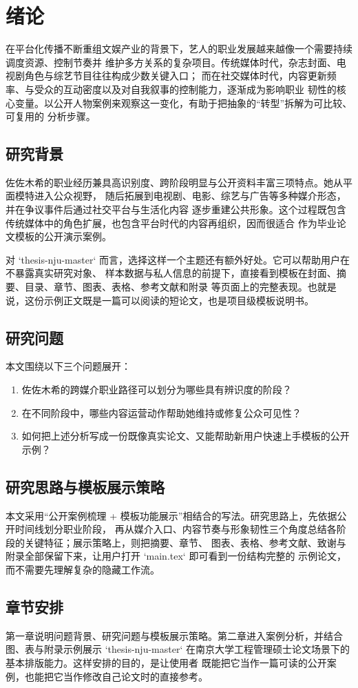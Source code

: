 \chapter{绪论}

在平台化传播不断重组文娱产业的背景下，艺人的职业发展越来越像一个需要持续调度资源、控制节奏并
维护多方关系的复杂项目。传统媒体时代，杂志封面、电视剧角色与综艺节目往往构成少数关键入口；
而在社交媒体时代，内容更新频率、与受众的互动密度以及对自我叙事的控制能力，逐渐成为影响职业
韧性的核心变量。以公开人物案例来观察这一变化，有助于把抽象的“转型”拆解为可比较、可复用的
分析步骤。

\section{研究背景}

佐佐木希的职业经历兼具高识别度、跨阶段明显与公开资料丰富三项特点。她从平面模特进入公众视野，
随后拓展到电视剧、电影、综艺与广告等多种媒介形态，并在争议事件后通过社交平台与生活化内容
逐步重建公共形象。这个过程既包含传统媒体中的角色扩展，也包含平台时代的内容再组织，因而很适合
作为毕业论文模板的公开演示案例。

对 `thesis-nju-master` 而言，选择这样一个主题还有额外好处。它可以帮助用户在不暴露真实研究对象、
样本数据与私人信息的前提下，直接看到模板在封面、摘要、目录、章节、图表、表格、参考文献和附录
等页面上的完整表现。也就是说，这份示例正文既是一篇可以阅读的短论文，也是项目级模板说明书。

\section{研究问题}

本文围绕以下三个问题展开：

\begin{enumerate}
  \item 佐佐木希的跨媒介职业路径可以划分为哪些具有辨识度的阶段？
  \item 在不同阶段中，哪些内容运营动作帮助她维持或修复公众可见性？
  \item 如何把上述分析写成一份既像真实论文、又能帮助新用户快速上手模板的公开示例？
\end{enumerate}

\section{研究思路与模板展示策略}

本文采用“公开案例梳理 + 模板功能展示”相结合的写法。研究思路上，先依据公开时间线划分职业阶段，
再从媒介入口、内容节奏与形象韧性三个角度总结各阶段的关键特征；展示策略上，则把摘要、章节、
图表、表格、参考文献、致谢与附录全部保留下来，让用户打开 `main.tex` 即可看到一份结构完整的
示例论文，而不需要先理解复杂的隐藏工作流。

\section{章节安排}

第一章说明问题背景、研究问题与模板展示策略。第二章进入案例分析，并结合图、表与附录示例展示
`thesis-nju-master` 在南京大学工程管理硕士论文场景下的基本排版能力。这样安排的目的，是让使用者
既能把它当作一篇可读的公开案例，也能把它当作修改自己论文时的直接参考。

